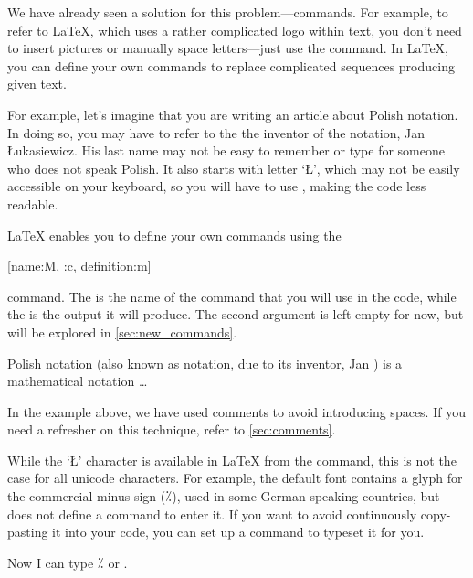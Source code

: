 We have already seen a solution for this problem---commands. For example, to
refer to \LaTeX{}, which uses a rather complicated logo within text, you don't
need to insert pictures or manually space letters---just use the 
command. In \LaTeX{}, you can define your own commands to replace
complicated sequences producing given text.

For example, let's imagine that you are writing an article about Polish
notation. In doing so, you may have to refer to the the inventor of the
notation, Jan Łukasiewicz. His last name may not be easy to remember or
type for someone who does not speak Polish. It also starts with letter
\enquote*{Ł}, which may not be easily accessible on your keyboard, so
you will have to use , making the code less readable.

\LaTeX{} enables you to define your own commands using the
\begin{lscommand}
  [name:M, {{}}:c, definition:m]
\end{lscommand}
command. The  is the name of the command that you will use in the
code, while the  is the output it will produce. The second
argument is left empty for now, but will be explored in
\autoref{sec:new_commands}.
\begin{example}

Polish notation (also known as
\lukas{} notation, due to its
inventor, Jan \lukas) is a
mathematical notation \ldots{}
\end{example}
In the example above, we have used \ai{\%} comments to avoid introducing spaces.
If you need a refresher on this technique, refer to \autoref{sec:comments}.

While the \enquote*{Ł} character is available in \LaTeX{} from the 
command, this is not the case for all unicode characters. For example, the
default font contains a glyph for the commercial minus sign (⁒), used in some
German speaking countries, but \LaTex{} does not define a command to enter it.
If you want to avoid continuously copy-pasting it into your code, you can set
up a command to typeset it for you.
\begin{example}

Now I can type ⁒ or \comminus.
\end{example}

